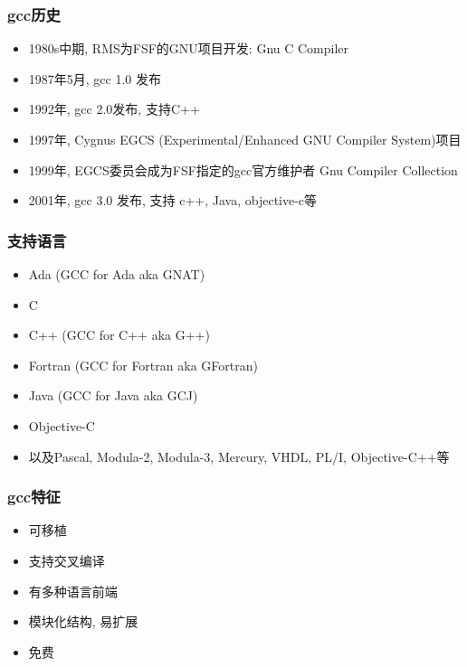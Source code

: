 \documentclass[compress]{beamer}
\begin{document}
\begin{frame}
\frametitle{gcc历史}

\begin{itemize}

\item 1980s中期, RMS为FSF的GNU项目开发: Gnu C Compiler
\item 1987年5月, gcc 1.0 发布
\item 1992年, gcc 2.0发布, 支持C++
\item 1997年, Cygnus EGCS (Experimental/Enhanced GNU Compiler System)项目
\item 1999年, EGCS委员会成为FSF指定的gcc官方维护者 Gnu Compiler Collection
\item 2001年, gcc 3.0 发布, 支持 c++, Java, objective-c等
\end{itemize}
\end{frame}

\begin{frame}
\frametitle{支持语言}

\begin{itemize}

\item Ada (GCC for Ada aka GNAT)
\item C
\item C++ (GCC for C++ aka G++)
\item Fortran (GCC for Fortran aka GFortran)
\item Java (GCC for Java aka GCJ)
\item Objective-C
\item 以及Pascal, Modula-2, Modula-3, Mercury, VHDL, PL/I, Objective-C++等
\end{itemize}

\end{frame}

\begin{frame}
\frametitle{gcc特征}

\begin{itemize}
\item 可移植
\item 支持交叉编译
\item 有多种语言前端
\item 模块化结构, 易扩展
\item 免费
\end{itemize}
\end{frame}
\end{document}
